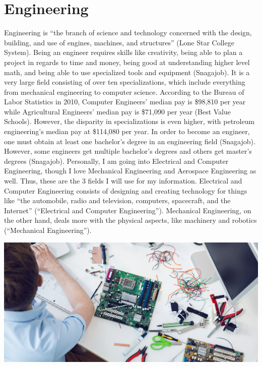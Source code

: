\chapter{Engineering}
\begin{multicols}{2}

Engineering is “the branch of science and technology concerned with the design, building, and use of engines, machines, and structures” (Lone Star College System). Being an engineer requires skills like creativity, being able to plan a project in regards to time and money, being good at understanding higher level math, and being able to use specialized tools and equipment (Snagajob). It is a very large field consisting of over ten specializations, which include everything from mechanical engineering to computer science. According to the Bureau of Labor Statistics in 2010, Computer Engineers’ median pay is \$98,810 per year while Agricultural Engineers’ median pay is \$71,090 per year (Best Value Schools). However, the disparity in specializations is even higher, with petroleum engineering’s median pay at \$114,080 per year. In order to become an engineer, one must obtain at least one bachelor’s degree in an engineering field (Snagajob). However, some engineers get multiple bachelor’s degrees and others get master’s degrees (Snagajob). Personally, I am going into Electrical and Computer Engineering, though I love Mechanical Engineering and Aerospace Engineering as well. Thus, these are the 3 fields I will use for my information. Electrical and Computer Engineering consists of designing and creating technology for things like “the automobile, radio and television, computers, spacecraft, and the Internet” (“Electrical and Computer Engineering”). Mechanical Engineering, on the other hand, deals more with the physical aspects, like machinery and robotics (“Mechanical Engineering”). 
    \begin{Figure}
     \centering
     \includegraphics[width=\linewidth]{images/Engineering}
     \label{fig:Building a Computer}
    \end{Figure}

\end{multicols}

